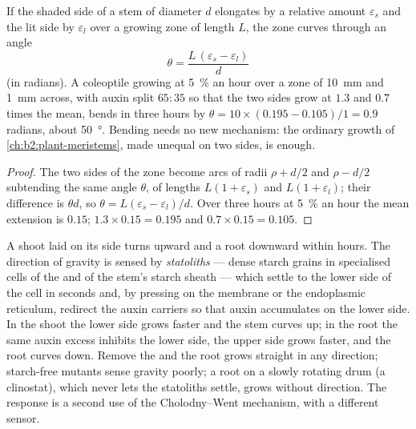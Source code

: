 \begin{theorem}\label{thm:b2:plant-plasticity:bend}
If the shaded side of a stem of diameter $d$ elongates by a relative
amount $\varepsilon_s$ and the lit side by $\varepsilon_l$ over a
growing zone of length $L$, the zone curves through an angle
\[
\theta = \frac{L\,(\varepsilon_s - \varepsilon_l)}{d}
\]
(in radians). A coleoptile growing at \qty{5}{\%} an hour over a
zone of \qty{10}{mm} and \qty{1}{mm} across, with auxin split
$65 : 35$ so that the two sides grow at $1.3$ and $0.7$ times the
mean, bends in three hours by $\theta = 10\times(0.195 - 0.105)/1 =
0.9$ radians, about \qty{50}{\degree}. Bending needs no new
mechanism: the ordinary growth of \cref{ch:b2:plant-meristems}, made
unequal on two sides, is enough.
\end{theorem}
\begin{proof}
The two sides of the zone become arcs of radii $\rho + d/2$ and
$\rho - d/2$ subtending the same angle $\theta$, of lengths $L(1 +
\varepsilon_s)$ and $L(1 + \varepsilon_l)$; their difference is
$\theta d$, so $\theta = L(\varepsilon_s - \varepsilon_l)/d$. Over
three hours at \qty{5}{\%} an hour the mean extension is $0.15$;
$1.3\times 0.15 = 0.195$ and $0.7\times 0.15 = 0.105$.
\end{proof}

\begin{proposition}[Gravitropism]\label{prop:b2:plant-plasticity:gravitropism}
A shoot laid on its side turns upward and a root downward within
hours. The direction of gravity is sensed by \emph{statoliths} ---
dense starch grains in specialised cells of the  and of the
stem's starch sheath --- which settle to the lower side of the cell
in seconds and, by pressing on the membrane or the endoplasmic
reticulum, redirect the auxin carriers so that auxin accumulates
on the lower side. In the shoot the lower side grows faster and the
stem curves up; in the root the same auxin excess inhibits the lower
side, the upper side grows faster, and the root curves down. Remove
the  and the root grows straight in any direction; starch-free
mutants sense gravity poorly; a root on a slowly rotating drum
(a clinostat), which never lets the statoliths settle, grows
without direction. The response is a second use of the
Cholodny--Went mechanism, with a different sensor.
\end{proposition}

